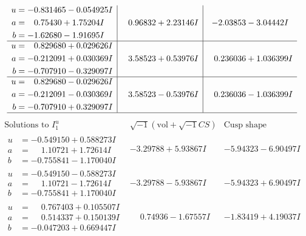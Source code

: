 \documentclass[1p]{elsarticle_modified}
\theoremstyle{definition}
\newcommand{\I}{\sqrt{-1}}
\begin{document}
$$\begin{array}{c|c|c}
\begin{aligned}
u &= -0.831465 - 0.054925 I \\
a &= \phantom{-}0.75430 + 1.75204 I \\
b &= -1.62680 - 1.91695 I\end{aligned}
 & \phantom{-}0.96832 + 2.23146 I & -2.03853 - 3.04442 I \\ \hline\begin{aligned}
u &= \phantom{-}0.829680 + 0.029626 I \\
a &= -0.212091 + 0.030369 I \\
b &= -0.707910 - 0.329097 I\end{aligned}
 & \phantom{-}3.58523 + 0.53976 I & \phantom{-}0.236036 + 1.036399 I \\ \hline\begin{aligned}
u &= \phantom{-}0.829680 - 0.029626 I \\
a &= -0.212091 - 0.030369 I \\
b &= -0.707910 + 0.329097 I\end{aligned}
 & \phantom{-}3.58523 - 0.53976 I & \phantom{-}0.236036 - 1.036399 I\\
 \hline 
 \end{array}$$\newpage$$\begin{array}{c|c|c}  
\text{Solutions to }I^u_{1}& \I (\text{vol} + \sqrt{-1}CS) & \text{Cusp shape}\\
 \hline 
\begin{aligned}
u &= -0.549150 + 0.588273 I \\
a &= \phantom{-}1.10721 + 1.72614 I \\
b &= -0.755841 - 1.170040 I\end{aligned}
 & -3.29788 + 5.93867 I & -5.94323 - 6.90497 I \\ \hline\begin{aligned}
u &= -0.549150 - 0.588273 I \\
a &= \phantom{-}1.10721 - 1.72614 I \\
b &= -0.755841 + 1.170040 I\end{aligned}
 & -3.29788 - 5.93867 I & -5.94323 + 6.90497 I \\ \hline\begin{aligned}
u &= \phantom{-}0.767403 + 0.105507 I \\
a &= \phantom{-}0.514337 + 0.150139 I \\
b &= -0.047203 + 0.669447 I\end{aligned}
 & \phantom{-}0.74936 - 1.67557 I & -1.83419 + 4.19037 I \\ \hline\begin{aligned}

\end{aligned}
\end{array}$$
\end{document}
